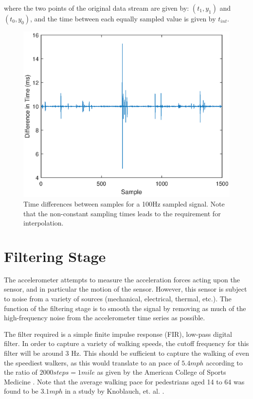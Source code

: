             where the two points of the original data stream are given by: $(t_1, y_1)$ and $(t_0, y_0)$, and the time between each equally sampled value is given by $t_{int}$.

            \begin{figure}[h]
                \includegraphics[width=\textwidth]{Images/sampling_freq.eps}
                \centering
                \caption{Time differences between samples for a 100Hz sampled signal. Note that the non-constant sampling times leads to the requirement for interpolation.}
                \label{img_sampling_freq}
            \end{figure}

        \section{Filtering Stage}

            The accelerometer attempts to measure the acceleration forces acting upon the sensor, and in particular the motion of the sensor. However, this sensor is subject to noise from a variety of sources (mechanical, electrical, thermal, etc.). The function of the filtering stage is to smooth the signal by removing as much of the high-frequency noise from the accelerometer time series as possible.

            The filter required is a simple finite impulse response (FIR), low-pass digital filter. In order to capture a variety of walking speeds, the cutoff frequency for this filter will be around 3 Hz. This should be sufficient to capture the walking of even the speediest walkers, as this would translate to an pace of $5.4 mph$ according to the ratio of $2000 steps = 1 mile$ as given by the American College of Sports Medicine \cite{acsm}. Note that the average walking pace for pedestrians aged 14 to 64 was found to be $3.1 mph$ in a study by Knoblauch, et. al. \cite{walking_speed}.

